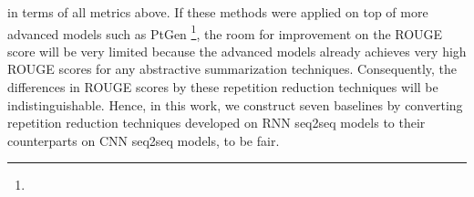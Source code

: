 \DIFdelbegin \DIFdel{,
}\DIFdelend in terms of all \DIFdelbegin {}\DIFdelend \DIFaddbegin {}\DIFaddend metrics above. 
If these \DIFaddbegin {}\DIFaddend methods 
were applied on top of more advanced models such as PtGen 
\DIFdelbegin {}\DIFdelend \DIFaddbegin \DIFadd{~}\footnote{}\DIFaddend , 
the room for improvement on the ROUGE score will be
very limited because the advanced models already achieves very high ROUGE scores for any abstractive
summarization techniques. 
Consequently, the differences in ROUGE scores by these repetition reduction techniques will be
indistinguishable. 
\DIFdelbegin {}%
\DIFdelend Hence, in this work, 
we \DIFdelbegin {}%
\DIFdelend construct seven baselines %
\DIFaddbegin \DIFadd{(}\DIFadd{)
}\DIFaddend by converting
repetition reduction techniques developed on RNN seq2seq models to their
counterparts on CNN seq2seq models,
to be fair.
\DIFdelbegin %

